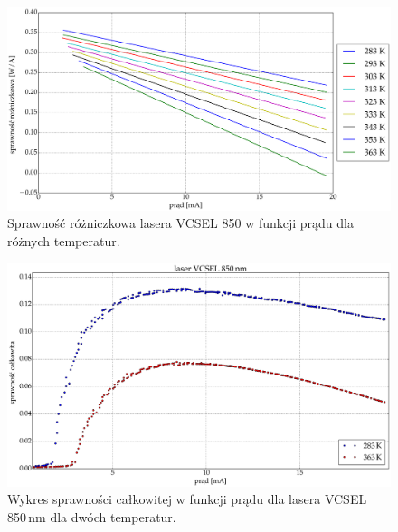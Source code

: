 \begin{figure}
\center
  \includegraphics[scale=0.25]{plot_vcsel_850/plot_eff_all_via_current.eps}
  \caption{Sprawność różniczkowa lasera VCSEL 850 w funkcji prądu dla różnych temperatur.}
  \label{fig:plot_eff_all_via_current_vcsel850}
\end{figure}
\begin{figure}
\center
  \includegraphics[scale=0.25]{plot_vcsel_850/plot_wall_eff.eps}
  \caption{Wykres sprawności całkowitej w funkcji prądu dla lasera VCSEL 850\,nm dla dwóch temperatur.}
  \label{fig:plot_wall_eff_vcsel850}
\end{figure}
\newpage
